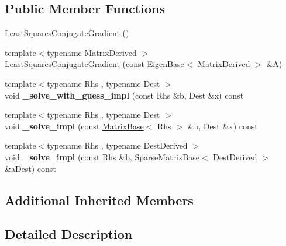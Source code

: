 \subsection*{Public Member Functions}
\begin{DoxyCompactItemize}
\item 
\mbox{\hyperlink{class_eigen_1_1_least_squares_conjugate_gradient_ace69f423fcc1f8960d0e2de0667447c9}{Least\+Squares\+Conjugate\+Gradient}} ()
\item 
{\footnotesize template$<$typename Matrix\+Derived $>$ }\\\mbox{\hyperlink{class_eigen_1_1_least_squares_conjugate_gradient_a91c4f2edc20f93cee9b721165937fb99}{Least\+Squares\+Conjugate\+Gradient}} (const \mbox{\hyperlink{struct_eigen_1_1_eigen_base}{Eigen\+Base}}$<$ Matrix\+Derived $>$ \&A)
\item 
\mbox{\label{class_eigen_1_1_least_squares_conjugate_gradient_a04c0c32b322d74949d190731a354340e}} 
{\footnotesize template$<$typename Rhs , typename Dest $>$ }\\void {\bfseries \+\_\+solve\+\_\+with\+\_\+guess\+\_\+impl} (const Rhs \&b, Dest \&x) const
\item 
\mbox{\label{class_eigen_1_1_least_squares_conjugate_gradient_aaadb8f72ca585e7dd5f41ddf7e14a9d3}} 
{\footnotesize template$<$typename Rhs , typename Dest $>$ }\\void {\bfseries \+\_\+solve\+\_\+impl} (const \mbox{\hyperlink{class_eigen_1_1_matrix_base}{Matrix\+Base}}$<$ Rhs $>$ \&b, Dest \&x) const
\item 
\mbox{\label{class_eigen_1_1_least_squares_conjugate_gradient_a7c2a35dde0ddb891b4030143ed286743}} 
{\footnotesize template$<$typename Rhs , typename Dest\+Derived $>$ }\\void {\bfseries \+\_\+solve\+\_\+impl} (const Rhs \&b, \mbox{\hyperlink{class_eigen_1_1_sparse_matrix_base}{Sparse\+Matrix\+Base}}$<$ Dest\+Derived $>$ \&a\+Dest) const
\end{DoxyCompactItemize}
\subsection*{Additional Inherited Members}


\subsection{Detailed Description}
